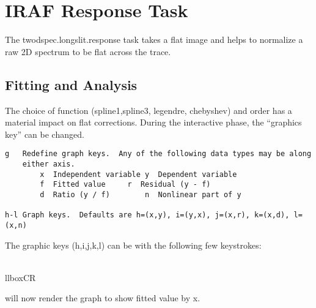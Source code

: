 \section{IRAF Response Task}

The twodspec.longslit.response task  takes a flat
image and helps to normalize a raw 2D spectrum to be flat across the trace.



\subsection{Fitting and Analysis}

The choice of function (spline1,spline3, legendre, chebyshev) and order has
a material impact on flat corrections. During the interactive phase,
the ``graphics key'' can be changed.

\begingroup \fontsize{10pt}{10pt}
\selectfont
{\color{deered}
\begin{verbatim} 
g	Redefine graph keys.  Any of the following data types may be along
	either axis.
	    x  Independent variable	y  Dependent variable
	    f  Fitted value		r  Residual (y - f)
	    d  Ratio (y / f)		n  Nonlinear part of y

h-l	Graph keys.  Defaults are h=(x,y), i=(y,x), j=(x,r), k=(x,d), l=(x,n)
\end{verbatim}
}
\endgroup

The graphic keys (h,i,j,k,l) can be  with the following
few keystrokes:

    \llbox{,}  \\llbox{CR}

will now render the graph to show fitted value by x.


